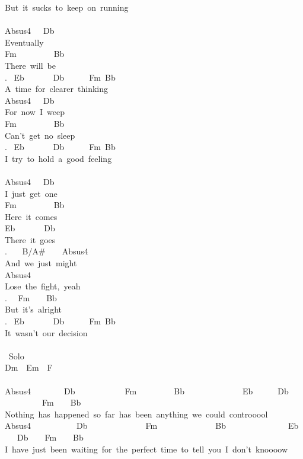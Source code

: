 {But\ it\ sucks\ to\ keep\ on\ running\\
\\
Absus4\ \ \ Db\\
Eventually\\
Fm\ \ \ \ \ \ \ \ \ Bb\\
There\ will\ be\\
. \ Eb\ \ \ \ \ \ \ Db\ \ \ \ \ \ Fm\ Bb\\
A\ time\ for\ clearer\ thinking\\
Absus4\ \ \ Db\\
For\ now\ I\ weep\\
Fm\ \ \ \ \ \ \ \ \ Bb\\
Can't\ get\ no\ sleep\\
. \ Eb\ \ \ \ \ \ \ Db\ \ \ \ \ \ Fm\ Bb\\
I\ try\ to\ hold\ a\ good\ feeling\\
\\
Absus4\ \ \ Db\\
I\ just\ get\ one\\
Fm\ \ \ \ \ \ \ \ \ Bb\\
Here\ it\ comes\\
Eb\ \ \ \ \ \ \ Db\\
There\ it\ goes\\
. \ \ \ B/A\#\ \ \ \ Absus4\ \\
And\ we\ just\ might\\
Absus4\ \ \ \\
Lose\ the\ fight,\ yeah\\
. \ \ Fm\ \ \ \ Bb\\
But\ it's\ alright\\
. \ Eb\ \ \ \ \ \ \ Db\ \ \ \ \ \ Fm\ Bb\\
It\ wasn't\ our\ decision\\
\\
\lbrack\ Solo\rbrack\\
Dm\ \ Em\ \ F\\
\\
Absus4\ \ \ \ \ \ \ \ Db\ \ \ \ \ \ \ \ \ \ \ \ Fm\ \ \ \ \ \ \ \ \ Bb\ \ \ \ \ \ \ \ \ \ \ \ \ \ Eb\ \ \ \ \ \ Db\ \ \ \ \ \ \ \ \ \ \ \ Fm\ \ \ \ Bb\\
Nothing\ has\ happened\ so\ far\ has\ been\ anything\ we\ could\ controoool\\
Absus4\ \ \ \ \ \ \ \ \ \ \ Db\ \ \ \ \ \ \ \ \ \ \ \ \ \ Fm\ \ \ \ \ \ \ \ \ \ \ \ \ \ Bb\ \ \ \ \ \ \ \ \ \ \ \ \ \ \ Eb\ \ \ \ Db\ \ \ \ Fm\ \ \ \ Bb\\
I\ have\ just\ been\ waiting\ for\ the\ perfect\ time\ to\ tell\ you\ I\ don't\ knoooow\\
}
